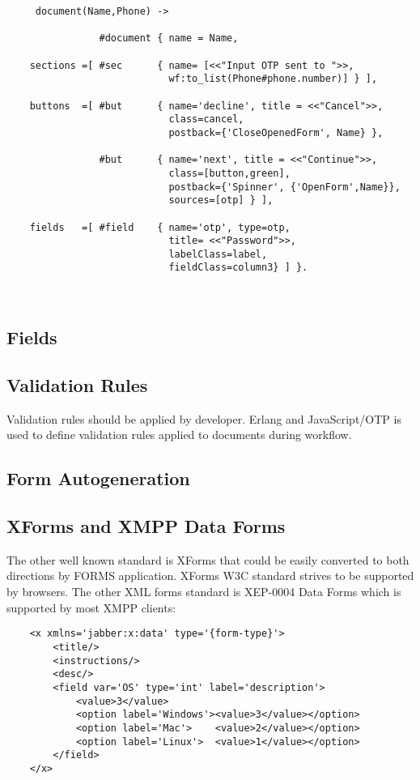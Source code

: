 \vspace{1\baselineskip}
\begin{lstlisting}
     document(Name,Phone) ->

                #document { name = Name,

    sections =[ #sec      { name= [<<"Input OTP sent to ">>,
                            wf:to_list(Phone#phone.number)] } ],

    buttons  =[ #but      { name='decline', title = <<"Cancel">>,
                            class=cancel,
                            postback={'CloseOpenedForm', Name} },

                #but      { name='next', title = <<"Continue">>,
                            class=[button,green],
                            postback={'Spinner', {'OpenForm',Name}},
                            sources=[otp] } ],

    fields   =[ #field    { name='otp', type=otp,
                            title= <<"Password">>,
                            labelClass=label,
                            fieldClass=column3} ] }.
\end{lstlisting}

\

\subsection{Fields}

\subsection{Validation Rules}
Validation rules should be applied by developer.
Erlang and JavaScript/OTP is used to define validation
rules applied to documents during workflow.

\subsection{Form Autogeneration}

\subsection{XForms and XMPP Data Forms}
The other well known standard is XForms that could be easily converted
to both directions by FORMS application. XForms W3C standard strives to be supported by browsers.
The other XML forms standard is XEP-0004 Data Forms which is supported by most XMPP clients:

\vspace{1\baselineskip}
\begin{lstlisting}
    <x xmlns='jabber:x:data' type='{form-type}'>
        <title/>
        <instructions/>
        <desc/>
        <field var='OS' type='int' label='description'>
            <value>3</value>
            <option label='Windows'><value>3</value></option>
            <option label='Mac'>    <value>2</value></option>
            <option label='Linux'>  <value>1</value></option>
        </field>
    </x>
\end{lstlisting}
